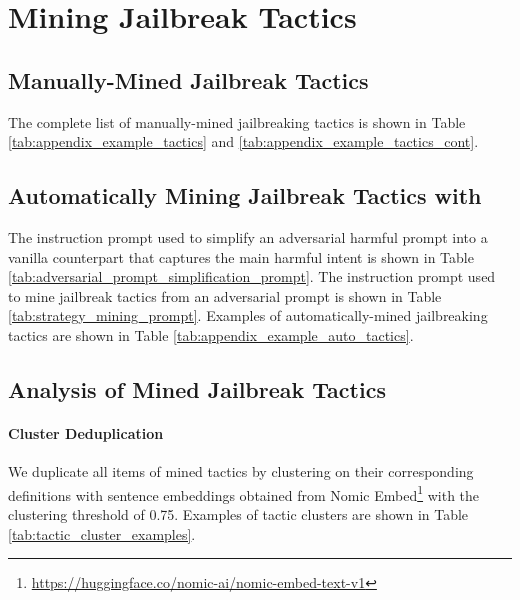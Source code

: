 \section{Mining Jailbreak Tactics}
\label{asec:strategy_mine}


\subsection{Manually-Mined Jailbreak Tactics}
\label{assec:manually_mined}



The complete list of manually-mined jailbreaking tactics is shown in Table \ref{tab:appendix_example_tactics} and \ref{tab:appendix_example_tactics_cont}.

\subsection{Automatically Mining Jailbreak Tactics with \gptfour}
\label{assec:tactics_mining_prompts}

The instruction prompt used to simplify an adversarial harmful prompt into a vanilla counterpart that captures the main harmful intent is shown in Table \ref{tab:adversarial_prompt_simplification_prompt}. The instruction prompt used to mine jailbreak tactics from an adversarial prompt is shown in Table \ref{tab:strategy_mining_prompt}. Examples of automatically-mined jailbreaking tactics are shown in Table 
\ref{tab:appendix_example_auto_tactics}.







\subsection{Analysis of Mined Jailbreak Tactics}

\paragraph{Cluster Deduplication}
We duplicate all items of mined tactics by clustering on their corresponding definitions with sentence embeddings obtained from Nomic Embed\footnote{\url{https://huggingface.co/nomic-ai/nomic-embed-text-v1}} with the clustering threshold of 0.75. Examples of tactic clusters are shown in Table \ref{tab:tactic_cluster_examples}.

